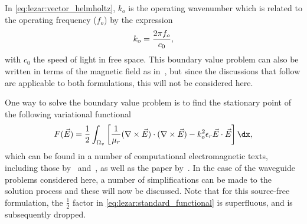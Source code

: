 In \eqref{eq:lezar:vector_helmholtz}, $k_o$ is the operating
wavenumber which is related to the
operating frequency ($f_o$) by the expression\vspace*{5pt}
\begin{equation}
\label{eq:lezar:operating_wavenumber}
 k_o = \frac{2\pi f_o}{c_0},\vspace*{2pt}
\end{equation}
with $c_0$ the speed of light in free space.  This boundary value
problem can also be written in terms of the magnetic field as
in~\citet{Jin2002}, but since the discussions that follow are applicable
to both formulations, this will not be considered here.

One way to solve the boundary value problem is to find the stationary
point of the following variational functional
\begin{equation}
  \label{eq:lezar:standard_functional}
  F(\vec{E})
      = \frac{1}{2}\int_{\Omega_v} \left[ \frac{1}{\mu_r}(\nabla\times{\vec{E}})\cdot(\nabla\times{\vec{E}})
      - k_o^2\epsilon_r\vec{E}\cdot{\vec{E}} \right] \dx,
\end{equation}
which can be found in a number of computational electromagnetic texts,
including those by~\citet{Jin2002}
and~\citet{PelosiCoccioliSelleri1998}, as well as the paper
by~\citet{LeeSunCendes1991}. In the case of the waveguide problems
considered here, a number of simplifications can be made to the
solution process and these will now be discussed. Note that for this
source-free formulation, the $\frac{1}{2}$ factor
in \eqref{eq:lezar:standard_functional} is superfluous, and is
subsequently dropped.

